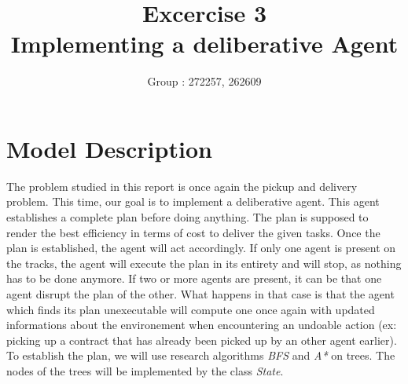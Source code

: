 \documentclass[11pt]{article}
\title{\bf Excercise 3\\ Implementing a deliberative Agent}
\author{Group \textnumero : 272257, 262609}
\begin{document}
\maketitle

\section{Model Description}
The problem studied in this report is once again the pickup and delivery problem. This time, our goal is to implement a deliberative agent. This agent establishes a complete plan before doing anything. The plan is supposed to render the best efficiency in terms of cost to deliver the given tasks. Once the plan is established, the agent will act accordingly. If only one agent is present on the tracks, the agent will execute the plan in its entirety and will stop, as nothing has to be done anymore. If two or more agents are present, it can be that one agent disrupt the plan of the other. What happens in that case is that the agent which finds its plan unexecutable will compute one once again with updated informations about the environement when encountering an undoable action (ex: picking up a contract that has already been picked up by an other agent earlier). To establish the plan, we will use research algorithms \emph{BFS} and \emph{A*} on trees. The nodes of the trees will be implemented by the class \emph{State}.
\end{document}
